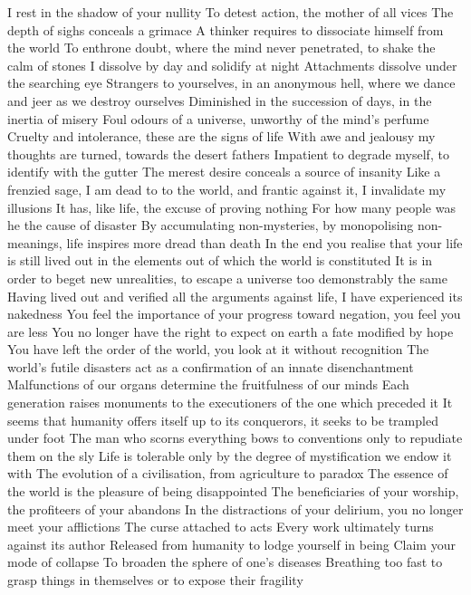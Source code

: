\documentclass{article}
\begin{document}
I rest in the shadow of your nullity
To detest action, the mother of all vices
The depth of sighs conceals a grimace
A thinker requires to dissociate himself from the world
To enthrone doubt, where the mind never penetrated, to shake the calm of stones
I dissolve by day and solidify at night
Attachments dissolve under the searching eye
Strangers to yourselves, in an anonymous hell, where we dance and jeer as we destroy ourselves
Diminished in the succession of days, in the inertia of misery
Foul odours of a universe, unworthy of the mind's perfume
Cruelty and intolerance, these are the signs of life
With awe and jealousy my thoughts are turned, towards the desert fathers
Impatient to degrade myself, to identify with the gutter
The merest desire conceals a source of insanity
Like a frenzied sage, I am dead to to the world, and frantic against it, I invalidate my illusions
It has, like life, the excuse of proving nothing
For how many people was he the cause of disaster
By accumulating non-mysteries, by monopolising non-meanings, life inspires more dread than death
In the end you realise that your life is still lived out in the elements out of which the world is constituted
It is in order to beget new unrealities, to escape a universe too demonstrably the same
Having lived out and verified all the arguments against life, I have experienced its nakedness
You feel the importance of your progress toward negation, you feel you are less
You no longer have the right to expect on earth a fate modified by hope
You have left the order of the world, you look at it without recognition
The world's futile disasters act as a confirmation of an innate disenchantment
Malfunctions of our organs determine the fruitfulness of our minds
Each generation raises monuments to the executioners of the one which preceded it
It seems that humanity offers itself up to its conquerors, it seeks to be trampled under foot
The man who scorns everything bows to conventions only to repudiate them on the sly
Life is tolerable only by the degree of mystification we endow it with
The evolution of a civilisation, from agriculture to paradox
The essence of the world is the pleasure of being disappointed
The beneficiaries of your worship, the profiteers of your abandons
In the distractions of your delirium, you no longer meet your afflictions
The curse attached to acts
Every work ultimately turns against its author
Released from humanity to lodge yourself in being
Claim your mode of collapse
To broaden the sphere of one's diseases
Breathing too fast to grasp things in themselves or to expose their fragility
\end{document}
